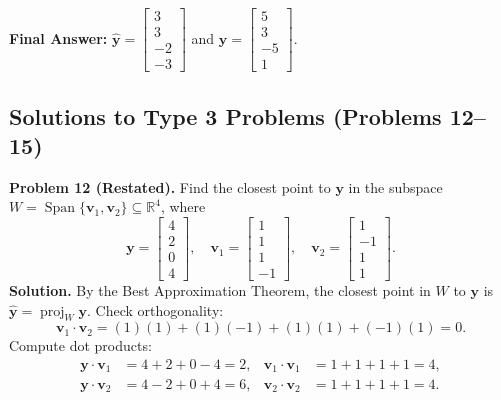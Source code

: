 \documentclass[11pt, letterpaper]{article}
\theoremstyle{definition}
\theoremstyle{remark}
\newcommand{\R}{\mathbb{R}}
\begin{document}
\textbf{Final Answer:} $\hat{\mathbf{y}} = \begin{bmatrix} 3 \\ 3 \\ -2 \\ -3 \end{bmatrix}$ and $\mathbf{y} = \begin{bmatrix} 5 \\ 3 \\ -5 \\ 1 \end{bmatrix}$.

\subsection{Solutions to Type 3 Problems (Problems 12--15)}

\textbf{Problem 12 (Restated).} Find the closest point to $\mathbf{y}$ in the subspace $W = \operatorname{Span}\{\mathbf{v}_1, \mathbf{v}_2\} \subseteq \R^4$, where
\[
\mathbf{y} = \begin{bmatrix} 4 \\ 2 \\ 0 \\ 4 \end{bmatrix}, \quad \mathbf{v}_1 = \begin{bmatrix} 1 \\ 1 \\ 1 \\ -1 \end{bmatrix}, \quad \mathbf{v}_2 = \begin{bmatrix} 1 \\ -1 \\ 1 \\ 1 \end{bmatrix}.
\]
\textbf{Solution.}
By the Best Approximation Theorem, the closest point in $W$ to $\mathbf{y}$ is $\hat{\mathbf{y}} = \operatorname{proj}_W \mathbf{y}$. Check orthogonality:
\[
\mathbf{v}_1 \cdot \mathbf{v}_2 = (1)(1) + (1)(-1) + (1)(1) + (-1)(1) = 0.
\]
Compute dot products:
\begin{align*}
\mathbf{y} \cdot \mathbf{v}_1 &= 4 + 2 + 0 - 4 = 2, & \mathbf{v}_1 \cdot \mathbf{v}_1 &= 1 + 1 + 1 + 1 = 4, \\
\mathbf{y} \cdot \mathbf{v}_2 &= 4 - 2 + 0 + 4 = 6, & \mathbf{v}_2 \cdot \mathbf{v}_2 &= 1 + 1 + 1 + 1 = 4.
\end{align*}
\end{document}
